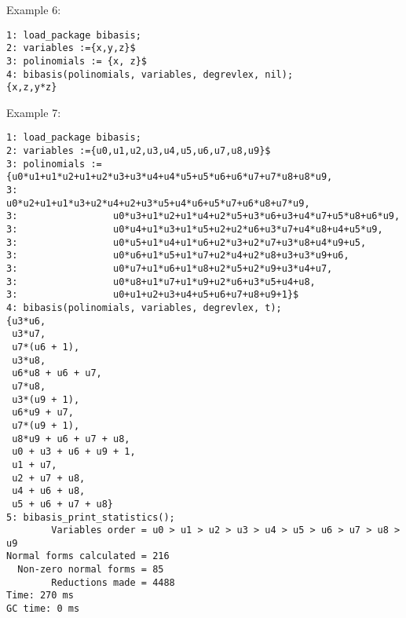 \documentclass[12pt]{article}
\begin{document}
\noindent Example 6:
\begin{verbatim}
1: load_package bibasis;
2: variables :={x,y,z}$
3: polinomials := {x, z}$
4: bibasis(polinomials, variables, degrevlex, nil);
{x,z,y*z}

\end{verbatim}

\noindent Example 7:
\begin{verbatim}
1: load_package bibasis;
2: variables :={u0,u1,u2,u3,u4,u5,u6,u7,u8,u9}$
3: polinomials := {u0*u1+u1*u2+u1+u2*u3+u3*u4+u4*u5+u5*u6+u6*u7+u7*u8+u8*u9,
3:                 u0*u2+u1+u1*u3+u2*u4+u2+u3*u5+u4*u6+u5*u7+u6*u8+u7*u9,
3:                 u0*u3+u1*u2+u1*u4+u2*u5+u3*u6+u3+u4*u7+u5*u8+u6*u9,
3:                 u0*u4+u1*u3+u1*u5+u2+u2*u6+u3*u7+u4*u8+u4+u5*u9,
3:                 u0*u5+u1*u4+u1*u6+u2*u3+u2*u7+u3*u8+u4*u9+u5,
3:                 u0*u6+u1*u5+u1*u7+u2*u4+u2*u8+u3+u3*u9+u6,
3:                 u0*u7+u1*u6+u1*u8+u2*u5+u2*u9+u3*u4+u7,
3:                 u0*u8+u1*u7+u1*u9+u2*u6+u3*u5+u4+u8,
3:                 u0+u1+u2+u3+u4+u5+u6+u7+u8+u9+1}$
4: bibasis(polinomials, variables, degrevlex, t);
{u3*u6,
 u3*u7,
 u7*(u6 + 1),
 u3*u8,
 u6*u8 + u6 + u7,
 u7*u8,
 u3*(u9 + 1),
 u6*u9 + u7,
 u7*(u9 + 1),
 u8*u9 + u6 + u7 + u8,
 u0 + u3 + u6 + u9 + 1,
 u1 + u7,
 u2 + u7 + u8,
 u4 + u6 + u8,
 u5 + u6 + u7 + u8}
5: bibasis_print_statistics();
        Variables order = u0 > u1 > u2 > u3 > u4 > u5 > u6 > u7 > u8 > u9
Normal forms calculated = 216
  Non-zero normal forms = 85
        Reductions made = 4488
Time: 270 ms
GC time: 0 ms

\end{verbatim}
\end{document}

